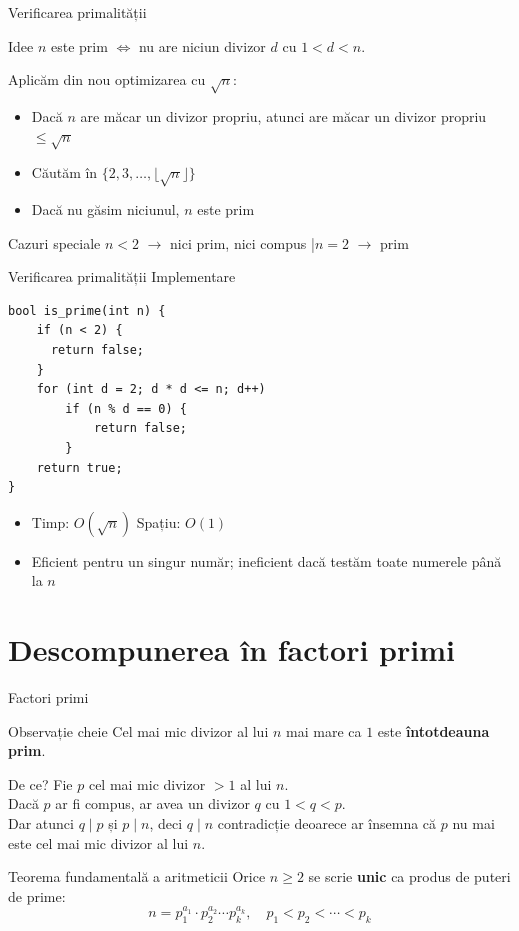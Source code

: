 ﻿\documentclass{beamer}
\begin{document}
\begin{frame}{Verificarea primalității}
  \begin{block}{Idee}
    $n$ este prim $\Leftrightarrow$ nu are niciun divizor $d$ cu $1 < d < n$.
  \end{block}
  \bigskip
  Aplicăm din nou optimizarea cu $\sqrt{n}$:
  \begin{itemize}
    \item Dacă $n$ are măcar un divizor propriu, atunci are măcar un divizor propriu $\leq \sqrt{n}$
    \item Căutăm în $\{2, 3, \ldots, \lfloor\sqrt{n}\rfloor\}$
    \item Dacă nu găsim niciunul, $n$ este prim
  \end{itemize}
  \bigskip
  \begin{block}{Cazuri speciale}
    $n < 2$ $\rightarrow$ nici prim, nici compus \quad|\quad $n = 2$ $\rightarrow$ prim
  \end{block}
\end{frame}

\begin{frame}{Verificarea primalității \textemdash{} Implementare}
  \begin{lstlisting}
bool is_prime(int n) {
    if (n < 2) {
      return false;
    }
    for (int d = 2; d * d <= n; d++)
        if (n % d == 0) {
            return false;
        }
    return true;
}
  \end{lstlisting}
  \bigskip
  \begin{itemize}
    \item Timp: $O(\sqrt{n})$ \quad Spațiu: $O(1)$
    \item Eficient pentru un singur număr; ineficient dacă testăm toate numerele până la $n$
  \end{itemize}
\end{frame}

\section{Descompunerea în factori primi}

\begin{frame}{Factori primi}
  \begin{block}{Observație cheie}
    Cel mai mic divizor al lui $n$ mai mare ca $1$ este \textbf{întotdeauna prim}.
  \end{block}
  \bigskip
  De ce? Fie $p$ cel mai mic divizor $> 1$ al lui $n$. \\
  Dacă $p$ ar fi compus, ar avea un divizor $q$ cu $1 < q < p$. \\
  Dar atunci $q \mid p$ și $p \mid n$, deci $q \mid n$ \textemdash{} contradicție deoarece ar însemna că $p$ nu mai este cel mai mic divizor al lui $n$.
  \bigskip
  \begin{block}{Teorema fundamentală a aritmeticii}
    Orice $n \geq 2$ se scrie \textbf{unic} ca produs de puteri de prime:
    \[
      n = p_1^{a_1} \cdot p_2^{a_2} \cdots p_k^{a_k}, \quad p_1 < p_2 < \cdots < p_k
    \]
  \end{block}
\end{frame}
\end{document}
